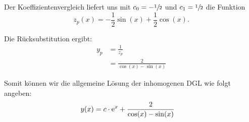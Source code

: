 \documentclass[main.tex]{subfiles}
\begin{document}
Der Koeffizientenvergleich liefert uns mit $c_0 = -\sfrac{1}{2}$ und $c_1 = \sfrac{1}{2}$ die Funktion
\[
	z_p(x) = -\frac{1}{2} \sin(x) + \frac{1}{2}\cos(x).
\]

Die Rücksubstitution ergibt:
\begin{align*}
	y_p &= \frac{1}{z_p} \\
	    &= \frac{2}{\cos(x) - \sin(x)}
\end{align*}

Somit können wir die allgemeine Lösung der inhomogenen DGL wie folgt angeben:
\begin{align*}
	y(x) &= c \cdot \mathrm{e}^{x} + \frac{2}{\cos(x) - \sin(x)}
\end{align*}
\end{document}
